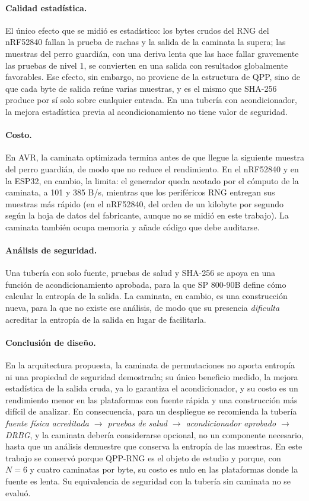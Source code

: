 \paragraph{Calidad estadística.} El único efecto que se midió es estadístico: los bytes crudos del RNG del nRF52840 fallan la prueba de rachas y la salida de la caminata la supera; las muestras del perro guardián, con una deriva lenta que las hace fallar gravemente las pruebas de nivel 1, se convierten en una salida con resultados globalmente favorables. Ese efecto, sin embargo, no proviene de la estructura de QPP, sino de que cada byte de salida reúne varias muestras, y es el mismo que SHA-256 produce por sí solo sobre cualquier entrada. En una tubería con acondicionador, la mejora estadística previa al acondicionamiento no tiene valor de seguridad.

\paragraph{Costo.} En AVR, la caminata optimizada termina antes de que llegue la siguiente muestra del perro guardián, de modo que no reduce el rendimiento. En el nRF52840 y en la ESP32, en cambio, la limita: el generador queda acotado por el cómputo de la caminata, a 101 y 385 B/s, mientras que los periféricos RNG entregan sus muestras más rápido (en el nRF52840, del orden de un kilobyte por segundo según la hoja de datos del fabricante, aunque no se midió en este trabajo). La caminata también ocupa memoria y añade código que debe auditarse.

\paragraph{Análisis de seguridad.} Una tubería con solo fuente, pruebas de salud y SHA-256 se apoya en una función de acondicionamiento aprobada, para la que SP 800-90B define cómo calcular la entropía de la salida. La caminata, en cambio, es una construcción nueva, para la que no existe ese análisis, de modo que su presencia \emph{dificulta} acreditar la entropía de la salida en lugar de facilitarla.

\paragraph{Conclusión de diseño.} En la arquitectura propuesta, la caminata de permutaciones no aporta entropía ni una propiedad de seguridad demostrada; su único beneficio medido, la mejora estadística de la salida cruda, ya lo garantiza el acondicionador, y su costo es un rendimiento menor en las plataformas con fuente rápida y una construcción más difícil de analizar. En consecuencia, para un despliegue se recomienda la tubería \emph{fuente física acreditada $\rightarrow$ pruebas de salud $\rightarrow$ acondicionador aprobado $\rightarrow$ DRBG}, y la caminata debería considerarse opcional, no un componente necesario, hasta que un análisis demuestre que conserva la entropía de las muestras. En este trabajo se conservó porque QPP-RNG es el objeto de estudio y porque, con $N = 6$ y cuatro caminatas por byte, su costo es nulo en las plataformas donde la fuente es lenta. Su equivalencia de seguridad con la tubería sin caminata no se evaluó.

